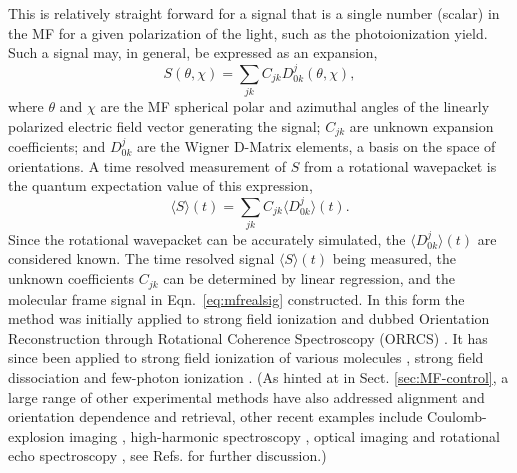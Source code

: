 \documentclass[10pt]{article}
\begin{document}
This is relatively straight forward for a signal that is a single number (scalar) in the MF for a given polarization of the light, such as the photoionization yield. Such a signal may, in general, be expressed as an expansion,
\begin{equation}
S(\theta,\chi)=\sum_{jk}C_{jk}D^{j}_{0k}(\theta,\chi),
\label{eq:mfrealsig}
\end{equation}
where $\theta$ and $\chi$ are the MF spherical polar and azimuthal angles of the linearly polarized electric field vector generating the signal; $C_{jk}$ are unknown expansion coefficients; and $D^{j}_{0k}$ are the Wigner D-Matrix elements, a basis on the space of orientations. A time resolved measurement of $S$ from a rotational wavepacket is the quantum expectation value of this expression,
\begin{equation}
\langle S \rangle(t) = \sum_{jk}C_{jk}\langle D^{j}_{0k} \rangle (t).
\label{eq:St-Cjk}
\end{equation}
Since the rotational wavepacket can be accurately simulated, the $\langle D^{j}_{0k} \rangle (t)$ are considered known. The time resolved signal $\langle S \rangle(t)$ being measured, the unknown coefficients $C_{jk}$ can be determined by linear regression, and the molecular frame signal in Eqn.~\ref{eq:mfrealsig} constructed. In this form the method was initially applied to strong field ionization and dubbed Orientation Reconstruction through Rotational Coherence Spectroscopy (ORRCS) \cite{makhija2016ORRCS,wang2017ORRCS}.
It has since been applied to strong field ionization of various molecules \cite{sandor2018ORRCS,sandor2019ORRCS,wangjam2021ORRCS},
strong field dissociation \cite{lam2020ORRCS} 
and few-photon ionization \cite{lam2022ORRCS}. 
(As hinted at in Sect. \ref{sec:MF-control}, a large range of other experimental methods have also addressed alignment and orientation dependence and retrieval, other recent examples include Coulomb-explosion imaging \cite{Underwood2015}, high-harmonic spectroscopy \cite{he2018RealTimeObservationMolecular, he2020MeasuringRotationalTemperature}, optical imaging \cite{Loriot2008} and rotational echo spectroscopy \cite{wang2022RotationalEchoSpectroscopy}, see Refs. \cite{Ramakrishna2013,koch2019QuantumControlMolecular} for further discussion.)
\end{document}
